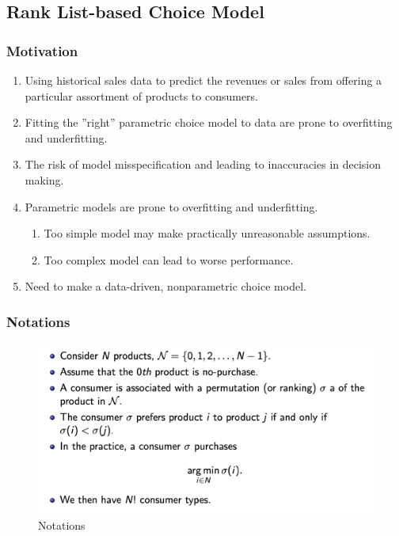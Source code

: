 \documentclass[11pt,a4paper]{article}
\begin{document}
\subsection{ Rank List-based Choice Model}
\subsubsection{ Motivation}
\begin{enumerate}[$\bullet$]
    \item Using historical sales data to predict the revenues or sales from offering a particular assortment of products to consumers.
    \item Fitting the ”right” parametric choice model to data are prone to overfitting and underfitting.
    \item The risk of model misspecification and leading to inaccuracies in decision making.
    \item Parametric models are prone to overfitting and underfitting.
    \begin{enumerate}
        \item Too simple model may make practically unreasonable assumptions.
        \item Too complex model can lead to worse performance.
    \end{enumerate}
    \item Need to make a data-driven, nonparametric choice model.
\end{enumerate}

\subsubsection{ Notations}
\begin{center}\begin{figure}[htbp]
    \centering
    \includegraphics[scale=0.5]{RLCM1.png}
    \caption{Notations}
    \label{}
\end{figure}\end{center}
\end{document}
